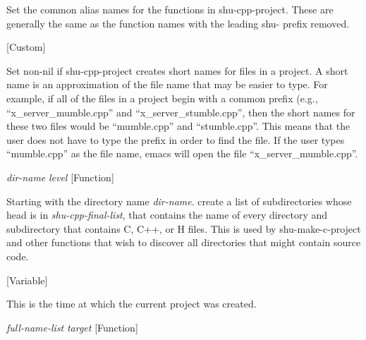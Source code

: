 \begin{doc-string}
Set the common alias names for the functions in shu-cpp-project.
These are generally the same as the function names with the leading
shu- prefix removed.
\end{doc-string}

\vspace{1em}
\noindent
{}
\usebox{\funcname}
 \hfill [Custom]

\begin{doc-string}
Set non-nil if shu-cpp-project creates short names for files in a project.  A
short name is an approximation of the file name that may be easier to type.  For
example, if all of the files in a project begin with a common prefix (e.g.,
``x\_server\_mumble.cpp'' and ``x\_server\_stumble.cpp'', then the short names for
these two files would be ``mumble.cpp'' and ``stumble.cpp''.  This means that
the user does not have to type the prefix in order to find the file.  If the
user types ``mumble.cpp'' as the file name, emacs will open the file
``x\_server\_mumble.cpp''.
\end{doc-string}

\vspace{1em}
\noindent
{}
\usebox{\funcname}\emph{dir-name} \emph{level}
 \hfill [Function]

\begin{doc-string}
Starting with the directory name \emph{dir-name}. create a list of subdirectories
whose head is in \emph{shu-cpp-final-list}, that contains the name of every directory and
subdirectory that contains C, C++, or H files.  This is used by shu-make-c-project
and other functions that wish to discover all directories that might contain
source code.
\end{doc-string}

\vspace{1em}
\noindent
{}
\usebox{\funcname}
 \hfill [Variable]

\begin{doc-string}
This is the time at which the current project was created.
\end{doc-string}

\vspace{1em}
\noindent
{}
\usebox{\funcname}\emph{full-name-list} \emph{target}
 \hfill [Function]

